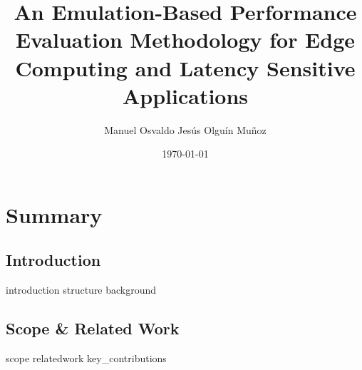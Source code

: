 \documentclass[electronic,oldfontcommands]{kthesis}
\begin{document}
\title{An Emulation-Based Performance Evaluation Methodology for Edge Computing and Latency Sensitive Applications}
\author{Manuel {Osvaldo Jesús} {Olguín Muñoz}}
\date{\today}
\address{%
	KTH Royal Institute of Technology\\%
	School of Electrical Engineering and Computer Science\\%
	Division of Information Science and Engineering\\%
	SE-10044 Stockholm\\%
	Sweden%
}

\maketitle

\frontmatter%




\clearpage%
\tableofcontents%

\mainmatter%
\glsresetall{} %
\part{Summary}\label{part:summary}
\newrefsection%
\chapter{Introduction}\label{chap:introduction}
{introduction}
{structure}
{background}

\chapter{Scope \& Related Work}\label{chap:relwork}
{scope}
{relatedwork}
{key_contributions}
\end{document}
